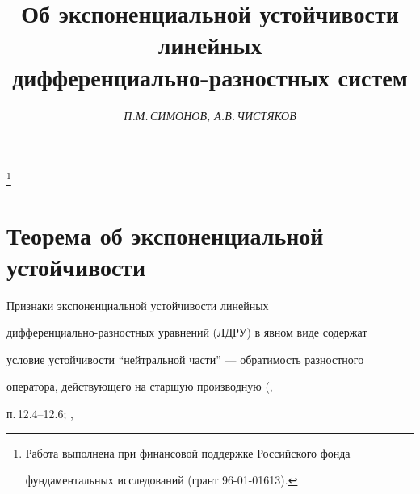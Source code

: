 



\author{\it П.М.\,СИМОНОВ, А.В.\,ЧИСТЯКОВ} 


\title{Об экспоненциальной устойчивости линейных\\


дифференциально-разностных систем}





\thanks{Работа выполнена при финансовой поддержке Российского фонда


фундаментальных исследований (грант 96-01-01613).}


\date{} 




 


\pagestyle{plain} %


 


 




 


\maketitle 


 




 





\section{Теорема об экспоненциальной устойчивости}





Признаки экспоненциальной устойчивости линейных


дифференциально-разностных уравнений (ЛДРУ) в явном виде содержат


условие устойчивости ``нейтральной части'' --- обратимость разностного


оператора, действующего на старшую производную (\cite{Hale},


п.\,12.4--12.6; \cite{Kol},


